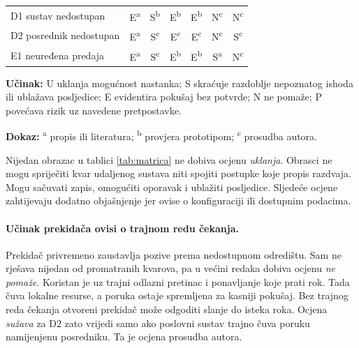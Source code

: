\begin{table}[H]
\begin{tabular}{@{}p{}cccccc@{}}
\addlinespace
D1 sustav nedostupan             & E\textsuperscript{a} & S\textsuperscript{b} & E\textsuperscript{b} & E\textsuperscript{b} & N\textsuperscript{c} & N\textsuperscript{c} \\
D2 posrednik nedostupan          & E\textsuperscript{a} & S\textsuperscript{c} & E\textsuperscript{c} & E\textsuperscript{c} & N\textsuperscript{c} & S\textsuperscript{c} \\
\addlinespace
E1 neuređena predaja             & E\textsuperscript{a} & S\textsuperscript{c} & E\textsuperscript{b} & E\textsuperscript{b} & S\textsuperscript{a} & N\textsuperscript{c} \\
\bottomrule
\end{tabular}

\vspace{0.4em}
\begin{minipage}{\textwidth}
\footnotesize
\textbf{Učinak:} U uklanja mogućnost nastanka; S skraćuje razdoblje nepoznatog ishoda ili ublažava posljedice; E evidentira pokušaj bez potvrde; N ne pomaže;
P povećava rizik uz navedene pretpostavke.

\textbf{Dokaz:} \textsuperscript{a} propis ili literatura;
\textsuperscript{b} provjera prototipom; \textsuperscript{c} prosudba autora.
\end{minipage}
\end{table}

Nijedan obrazac u tablici \ref{tab:matrica} ne dobiva ocjenu
\emph{uklanja}. Obrasci ne mogu spriječiti kvar udaljenog sustava niti
spojiti postupke koje propis razdvaja. Mogu sačuvati zapis, omogućiti
oporavak i ublažiti posljedice. Sljedeće ocjene zahtijevaju dodatno
objašnjenje jer ovise o konfiguraciji ili dostupnim podacima.

\paragraph{Učinak prekidača ovisi o trajnom redu čekanja.}
Prekidač privremeno zaustavlja pozive prema nedostupnom odredištu. Sam ne
rješava nijedan od promatranih kvarova, pa u većini redaka dobiva ocjenu
\emph{ne pomaže}. Koristan je uz trajni odlazni pretinac i ponavljanje koje
prati rok. Tada čuva lokalne resurse, a poruka ostaje spremljena za kasniji
pokušaj. Bez trajnog reda čekanja otvoreni prekidač može odgoditi slanje do
isteka roka. Ocjena \emph{sužava} za D2 zato vrijedi samo ako poslovni
sustav trajno čuva poruku namijenjenu posredniku. Ta je ocjena prosudba
autora.

